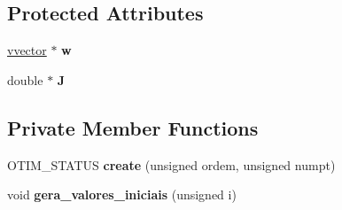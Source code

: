 \subsection*{Protected Attributes}
\begin{DoxyCompactItemize}
\item 
\hyperlink{classvvector}{vvector} $\ast$ {\bfseries w}\hypertarget{classotim_a96676e4c090ca89145e2618591a15edc}{}\label{classotim_a96676e4c090ca89145e2618591a15edc}

\item 
double $\ast$ {\bfseries J}\hypertarget{classotim_a84c8f815c2414077faeea503eda944a9}{}\label{classotim_a84c8f815c2414077faeea503eda944a9}

\end{DoxyCompactItemize}
\subsection*{Private Member Functions}
\begin{DoxyCompactItemize}
\item 
O\+T\+I\+M\+\_\+\+S\+T\+A\+T\+US {\bfseries create} (unsigned ordem, unsigned numpt)\hypertarget{classotim_ab351906b9f0c0f28ea6748f5e67686e1}{}\label{classotim_ab351906b9f0c0f28ea6748f5e67686e1}

\item 
void {\bfseries gera\+\_\+valores\+\_\+iniciais} (unsigned i)\hypertarget{classotim_a0d54b653db3dbb95db3cf530877c565e}{}\label{classotim_a0d54b653db3dbb95db3cf530877c565e}

\end{DoxyCompactItemize}
